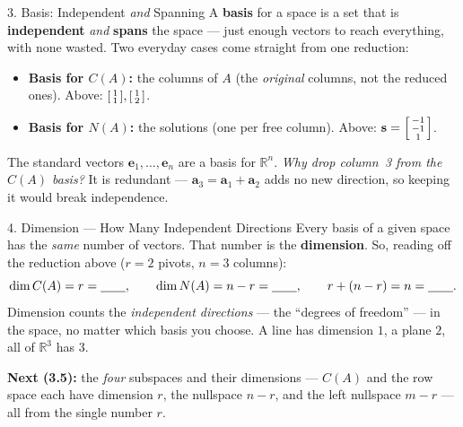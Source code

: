 \documentclass[10pt]{article}
\newcommand{\svec}{\mathbf{s}}
\begin{document}
\begin{notesbox}{3. Basis: Independent \emph{and} Spanning}
A \textbf{basis} for a space is a set that is \textbf{independent} \emph{and} \textbf{spans} the space ---
just enough vectors to reach everything, with none wasted. Two everyday cases come straight from one
reduction:
\begin{itemize}\setlength{\itemsep}{2pt}
  \item \textbf{Basis for $C(A)$:} the \blank{2.2cm} columns of $A$ (the \emph{original} columns, not the reduced ones). Above: $\begin{bsmallmatrix} 1\\1 \end{bsmallmatrix},\begin{bsmallmatrix} 1\\2 \end{bsmallmatrix}$.
  \item \textbf{Basis for $N(A)$:} the \blank{2.2cm} solutions (one per free column). Above: $\svec=\begin{bsmallmatrix} -1\\-1\\1 \end{bsmallmatrix}$.
\end{itemize}
The standard vectors $\mathbf{e}_1,\dots,\mathbf{e}_n$ are a basis for $\mathbb{R}^n$. \emph{Why drop
column~3 from the $C(A)$ basis?} It is redundant --- $\mathbf{a}_3=\mathbf{a}_1+\mathbf{a}_2$ adds no new
direction, so keeping it would break independence.
\end{notesbox}

\begin{notesbox}{4. Dimension --- How Many Independent Directions}
Every basis of a given space has the \emph{same} number of vectors. That number is the
\textbf{dimension}. So, reading off the reduction above ($r=2$ pivots, $n=3$ columns):
\[
  \dim C(A)=r=\blank{0.7cm}, \qquad \dim N(A)=n-r=\blank{0.7cm}, \qquad r+(n-r)=n=\blank{0.7cm}.
\]
Dimension counts the \emph{independent directions} --- the ``degrees of freedom'' --- in the space, no
matter which basis you choose. A line has dimension $1$, a plane $2$, all of $\mathbb{R}^3$ has $3$.

\vspace{2pt}
\textbf{Next (3.5):} the \emph{four} subspaces and their dimensions --- $C(A)$ and the row space each have
dimension $r$, the nullspace $n-r$, and the left nullspace $m-r$ --- all from the single number $r$.
\end{notesbox}
\end{document}

